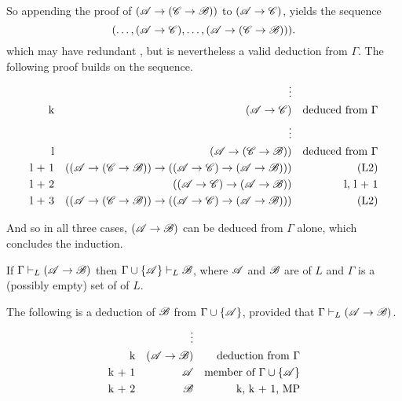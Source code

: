 \begin{proposition}
\begin{enumerate}
    So appending the proof of \((\mathscr{A} \rightarrow (\mathscr{C} \rightarrow \mathscr{B}))\) to \((\mathscr{A} \rightarrow \mathscr{C})\), yields the sequence
      \[(\dots, (\mathscr{A} \rightarrow \mathscr{C}), \dots, (\mathscr{A} \rightarrow (\mathscr{C} \rightarrow \mathscr{B}))).\]
    which may have redundant \wfs{}, but is nevertheless a valid deduction from \(\Gamma\). The following proof builds on the sequence.
    \begin{align*}
      &&
      \vdots&&
      \\
      \text{k}&&
      (\mathscr{A} \rightarrow \mathscr{C})&&
      \text{deduced from \(\Gamma\)}\\
      &&
      \vdots&&
      \\
      \text{l}&&
      (\mathscr{A} \rightarrow (\mathscr{C} \rightarrow \mathscr{B}))&&
      \text{deduced from \(\Gamma\)}\\
      \text{l + 1}&&
      ((\mathscr{A} \rightarrow (\mathscr{C} \rightarrow \mathscr{B})) \rightarrow ((\mathscr{A} \rightarrow \mathscr{C}) \rightarrow (\mathscr{A} \rightarrow \mathscr{B})))&&
      \text{(L2)}\\
      \text{l + 2}&&
      ((\mathscr{A} \rightarrow \mathscr{C}) \rightarrow (\mathscr{A} \rightarrow \mathscr{B}))&&
      \text{l, l + 1}\\
      \text{l + 3}&&
      ((\mathscr{A} \rightarrow (\mathscr{C} \rightarrow \mathscr{B})) \rightarrow ((\mathscr{A} \rightarrow \mathscr{C}) \rightarrow (\mathscr{A} \rightarrow \mathscr{B})))&&
      \text{(L2)}
    \end{align*}
  \end{enumerate}

  And so in all three cases, \((\mathscr{A} \rightarrow \mathscr{B})\) can be deduced from \(\Gamma\) alone, which concludes the induction.
\end{proposition}

\begin{proposition}
  If \(\Gamma \vdash_{L} (\mathscr{A} \rightarrow \mathscr{B})\) then \(\Gamma \cup \{\mathscr{A}\} \vdash_{L} \mathscr{B}\), where \(\mathscr{A}\) and \(\mathscr{B}\) are \wfs{} of \(L\) and \(\Gamma\) is a (possibly empty) set of \wfs{} of \(L\).

  \prf{} The following is a deduction of \(\mathscr{B}\) from \(\Gamma \cup \{\mathscr{A}\}\), provided that \(\Gamma \vdash_{L} (\mathscr{A} \rightarrow \mathscr{B})\).
  \begin{align*}
    &&
    \vdots&&
    \\
    \text{k}&&
    (\mathscr{A} \rightarrow \mathscr{B})&&
    \text{deduction from \(\Gamma\)}\\
    \text{k + 1}&&
    \mathscr{A}&&
    \text{member of \(\Gamma \cup \{\ensuremath\mathscr{A}\}\)}\\
    \text{k + 2}&&
    \mathscr{B}&&
    \text{k, k + 1, MP}
  \end{align*}
\end{proposition}

